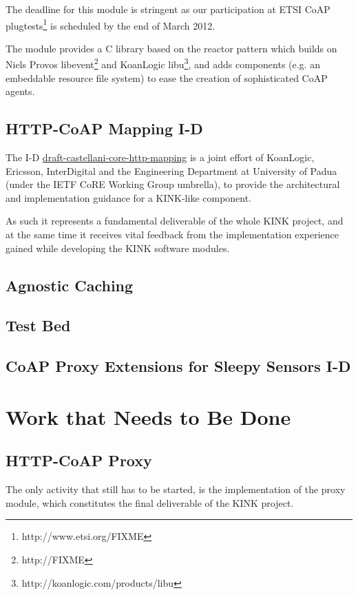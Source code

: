 \documentclass[12pt]{article}
\begin{document}
The deadline for this module is stringent as our participation at ETSI CoAP plugtests\footnote{http://www.etsi.org/FIXME} is scheduled by the end of March 2012.

The module provides a C library based on the reactor pattern which builds on Niels Provos libevent\footnote{http://FIXME} and KoanLogic libu\footnote{http://koanlogic.com/products/libu}, and adds components (e.g. an embeddable resource file system) to ease the creation of sophisticated CoAP agents.

\subsection{HTTP-CoAP Mapping I-D}
The I-D \href{http://tools.ietf.org/html/draft-castellani-core-http-mapping}{draft-castellani-core-http-mapping} is a joint effort of \mbox{KoanLogic}, \mbox{Ericsson}, \mbox{InterDigital} and the Engineering Department at University of Padua (under the IETF CoRE Working Group umbrella), to provide the architectural and implementation guidance for a KINK-like component.

As such it represents a fundamental deliverable of the whole KINK project, and at the same time it receives vital feedback from the implementation experience gained while developing the KINK software modules.

\subsection{Agnostic Caching}


\subsection{Test Bed}


\subsection{CoAP Proxy Extensions for Sleepy Sensors I-D}



\section{Work that Needs to Be Done}
\subsection{HTTP-CoAP Proxy}
The only activity that still has to be started, is the implementation of the proxy module, which constitutes the final deliverable of the KINK project. 
\end{document}
